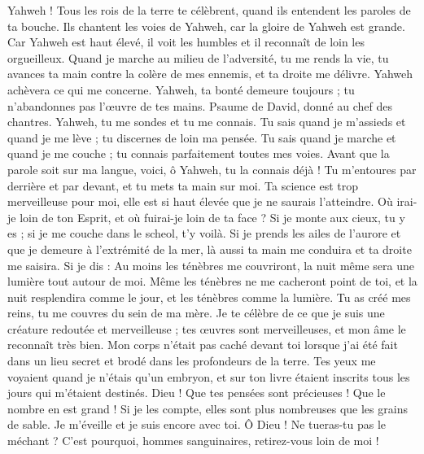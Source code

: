 \begin{multicols}{2}
Yahweh ! Tous les rois de la terre te célèbrent, quand ils entendent les paroles de ta bouche.
Ils chantent les voies de Yahweh, car la gloire de Yahweh est grande.
Car Yahweh est haut élevé, il voit les humbles et il reconnaît de loin les orgueilleux.
Quand je marche au milieu de l'adversité, tu me rends la vie, tu avances ta main contre la colère de mes ennemis, et ta droite me délivre.
Yahweh achèvera ce qui me concerne. Yahweh, ta bonté demeure toujours ; tu n'abandonnes pas l'œuvre de tes mains.
\VerseOne{}Psaume de David, donné au chef des chantres. Yahweh, tu me sondes et tu me connais.
Tu sais quand je m'assieds et quand je me lève ; tu discernes de loin ma pensée.
Tu sais quand je marche et quand je me couche ; tu connais parfaitement toutes mes voies.
Avant que la parole soit sur ma langue, voici, ô Yahweh, tu la connais déjà !
Tu m'entoures par derrière et par devant, et tu mets ta main sur moi.
Ta science est trop merveilleuse pour moi, elle est si haut élevée que je ne saurais l'atteindre.
Où irai-je loin de ton Esprit, et où fuirai-je loin de ta face ?
Si je monte aux cieux, tu y es ; si je me couche dans le scheol, t'y voilà.
Si je prends les ailes de l'aurore et que je demeure à l'extrémité de la mer,
là aussi ta main me conduira et ta droite me saisira.
Si je dis : Au moins les ténèbres me couvriront, la nuit même sera une lumière tout autour de moi.
Même les ténèbres ne me cacheront point de toi, et la nuit resplendira comme le jour, et les ténèbres comme la lumière.
Tu as créé mes reins, tu me couvres du sein de ma mère.
Je te célèbre de ce que je suis une créature redoutée et merveilleuse ; tes œuvres sont merveilleuses, et mon âme le reconnaît très bien.
Mon corps n'était pas caché devant toi lorsque j'ai été fait dans un lieu secret et brodé dans les profondeurs de la terre.
Tes yeux me voyaient quand je n'étais qu'un embryon, et sur ton livre étaient inscrits tous les jours qui m'étaient destinés.
Dieu ! Que tes pensées sont précieuses ! Que le nombre en est grand !
Si je les compte, elles sont plus nombreuses que les grains de sable. Je m'éveille et je suis encore avec toi.
Ô Dieu ! Ne tueras-tu pas le méchant ? C'est pourquoi, hommes sanguinaires, retirez-vous loin de moi !

\end{multicols}
